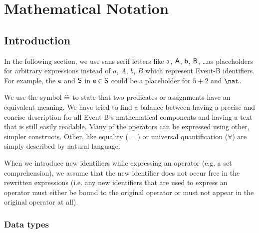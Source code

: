 \section{Mathematical Notation}
\label{mathematical_notation}

\subsection{Introduction}
\label{mathematical_notation_introduction}

In the following section, we use sans serif letters like $\textsf{a}$, $\textsf{A}$, $\textsf{b}$, $\textsf{B}$, \ldots as
placeholders for arbitrary expressions instead of $a$, $A$, $b$, $B$ which represent
Event-B identifiers.
For example, the $\textsf{e}$ and $\textsf{S}$ in $\textsf{e}\in\textsf{S}$ could be a placeholder for $5+2$ and $\nat$.

We use the symbol $\mathrel{\widehat=}$ to state that two predicates or assignments have an equivalent meaning.
We have tried to find a balance between having a precise and concise description for all Event-B's
mathematical components and having a text that is still easily readable.
Many of the operators can be expressed using other, simpler constructs.
Other, like equality ($=$) or universal quantification ($\forall$) are simply described by natural language.

When we introduce new identifiers while expressing an operator (e.g. a set comprehension), we assume that the new identifier does not occur free in the rewritten expressions  (i.e. any new identifiers that are used to express an operator must either be bound to the original operator or must not appear in the original operator at all). 


\subsubsection{Data types}
\label{data_types}

